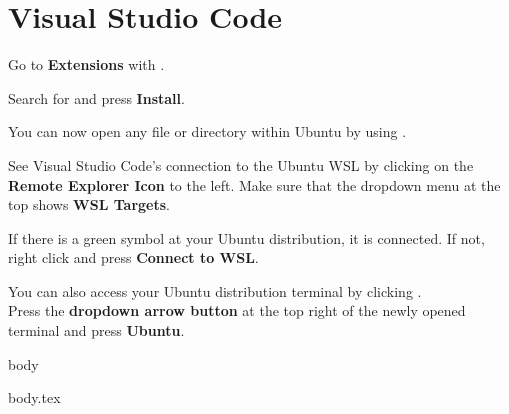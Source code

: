 \section{Visual Studio Code}


Go to \textbf{Extensions} with .

Search for  and press \textbf{Install}.

You can now open any file or directory within Ubuntu by using .

See Visual Studio Code's connection to the Ubuntu WSL by clicking on the \textbf{Remote Explorer Icon} to the left. Make sure that the dropdown menu at the top shows \textbf{WSL Targets}.

If there is a green symbol at your Ubuntu distribution, it is connected. If not,\\right click and press \textbf{Connect to WSL}.

You can also access your Ubuntu distribution terminal by clicking .\\
Press the \textbf{dropdown arrow button} at the top right of the newly opened terminal and press \textbf{Ubuntu}.

\ifdefined\vscodeCProgramming
{body}
\fi

\ifdefined\vscodeLatex
{body.tex}
\fi